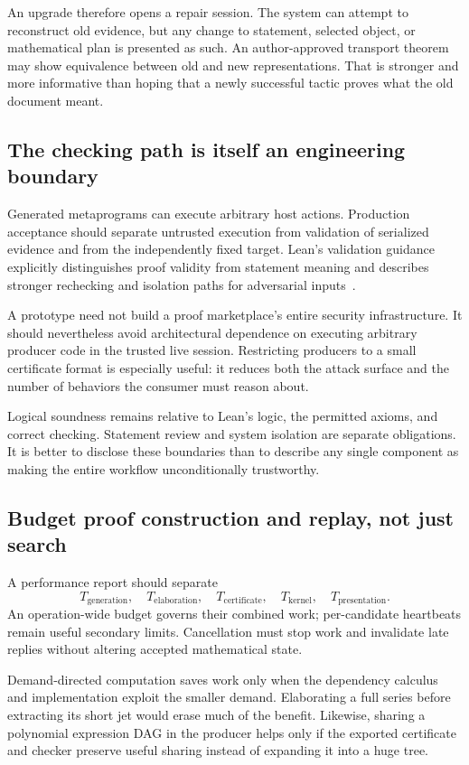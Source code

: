 \documentclass[11pt,a4paper]{article}
\theoremstyle{definition}
\begin{document}
An upgrade therefore opens a repair session. The system can attempt to reconstruct old evidence, but any change to statement, selected object, or mathematical plan is presented as such. An author-approved transport theorem may show equivalence between old and new representations. That is stronger and more informative than hoping that a newly successful tactic proves what the old document meant.

\subsection{The checking path is itself an engineering boundary}
Generated metaprograms can execute arbitrary host actions. Production acceptance should separate untrusted execution from validation of serialized evidence and from the independently fixed target. Lean's validation guidance explicitly distinguishes proof validity from statement meaning and describes stronger rechecking and isolation paths for adversarial inputs~\cite{leanvalidate}.

A prototype need not build a proof marketplace's entire security infrastructure. It should nevertheless avoid architectural dependence on executing arbitrary producer code in the trusted live session. Restricting producers to a small certificate format is especially useful: it reduces both the attack surface and the number of behaviors the consumer must reason about.

Logical soundness remains relative to Lean's logic, the permitted axioms, and correct checking. Statement review and system isolation are separate obligations. It is better to disclose these boundaries than to describe any single component as making the entire workflow unconditionally trustworthy.

\subsection{Budget proof construction and replay, not just search}
A performance report should separate
\[
 T_{\mathrm{generation}},\quad T_{\mathrm{elaboration}},\quad
 T_{\mathrm{certificate}},\quad T_{\mathrm{kernel}},\quad
 T_{\mathrm{presentation}}.
\]
An operation-wide budget governs their combined work; per-candidate heartbeats remain useful secondary limits. Cancellation must stop work and invalidate late replies without altering accepted mathematical state.

Demand-directed computation saves work only when the dependency calculus and implementation exploit the smaller demand. Elaborating a full series before extracting its short jet would erase much of the benefit. Likewise, sharing a polynomial expression DAG in the producer helps only if the exported certificate and checker preserve useful sharing instead of expanding it into a huge tree.
\end{document}
